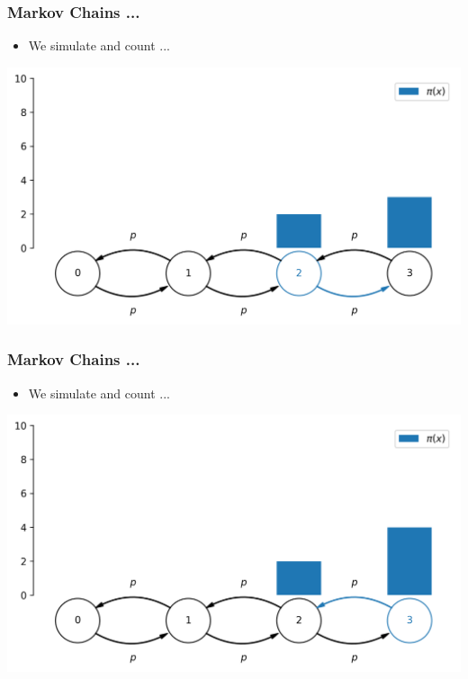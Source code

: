 \begin{frame}[c]
    \frametitle{Markov Chains ...}
    \begin{itemize}
        \item We simulate and count ...
    \end{itemize}
    \begin{center}
        \includegraphics[scale=0.6]{imgs/simulation4.png}
    \end{center}
\end{frame}

\begin{frame}[c]
    \frametitle{Markov Chains ...}
    \begin{itemize}
        \item We simulate and count ...
    \end{itemize}
    \begin{center}
        \includegraphics[scale=0.6]{imgs/simulation5.png}
    \end{center}
\end{frame}

